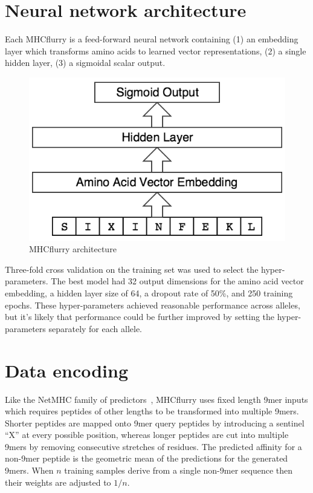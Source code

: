 \section{Neural network architecture}
Each MHCflurry is a feed-forward neural network containing (1) an embedding layer which transforms amino acids to learned vector representations, (2) a single hidden layer, (3) a sigmoidal scalar output.

\begin{figure}[h]
\centering
\includegraphics[scale=0.5]{figures/mhcflurry-gliffy-network.png}
\caption{MHCflurry architecture}
\label{fig:architecture}
\end{figure}

Three-fold cross validation on the training set was used to select the hyper-parameters. The best model had 32 output dimensions for the amino acid vector embedding, a hidden layer size of 64, a dropout rate\cite{Srivastava2014} of 50\%, and 250 training epochs. These hyper-parameters achieved reasonable performance across alleles, but it's likely that performance could be further improved by setting the hyper-parameters separately for each allele.

\section{Data encoding}

Like the NetMHC family of predictors~\cite{lundegaard2008accurate}, MHCflurry uses fixed length 9mer inputs which requires peptides of other lengths to be transformed into multiple 9mers. Shorter peptides are mapped onto 9mer query peptides by introducing a sentinel ``X'' at every possible position, whereas longer peptides are cut into multiple 9mers by removing consecutive stretches of residues. The predicted affinity for a non-9mer peptide is the geometric mean of the predictions for the generated 9mers. When $n$ training samples derive from a single non-9mer sequence then their weights are adjusted to $1/n$. 

